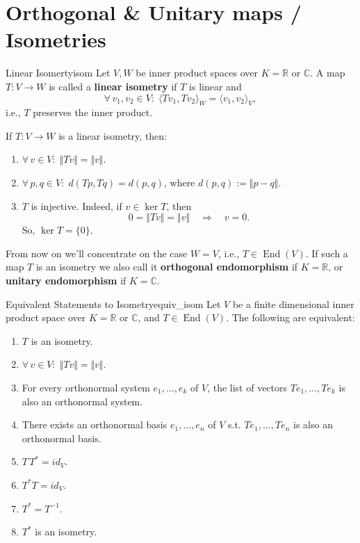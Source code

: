 % 
%
%
%

\section{Orthogonal \& Unitary maps / Isometries}
\begin{definition}{Linear Isomerty}{isom}
	Let $V, W$ be inner product spaces over $K = \mathbb{R}$ or $\mathbb{C}$. A map $T: V \to W$ is called a \textbf{linear isometry} if $T$ is linear and
	\[
		\forall \, v_1, v_2 \in V : \; \langle Tv_1, Tv_2 \rangle_W = \langle v_1, v_2 \rangle_V,
	\]
	i.e., $T$ preserves the inner product.
\end{definition}

\begin{remark}
	If $T:V \to W$ is a linear isometry, then:
	\begin{enumerate}
		\item $\forall \, v \in V : \; \Vert Tv \Vert = \Vert v \Vert$.
		\item $\forall\, p,q \in V : \; d(Tp, Tq) = d(p, q)$, where $d(p, q) := \Vert p - q \Vert$.
		\item $T$ is injective. Indeed, if $v \in \ker T$, then 
		\[
			0 = \Vert Tv \Vert = \Vert v \Vert \quad \Longrightarrow \quad v = 0.
		\]
		So, $\ker T = \{0\}$.
	\end{enumerate}
\end{remark}

From now on we'll concentrate on the case $W = V$, i.e., $T \in \operatorname{End}(V)$. If such a map $T$ is an isometry we also call it \textbf{orthogonal endomorphism} if $K = \mathbb{R}$, or \textbf{unitary endomorphism} if $K = \mathbb{C}$.

\begin{theorem}{Equivalent Statements to Isometry}{equiv_isom}
	Let $V$ be a finite dimensional inner product space over $K = \mathbb{R}$ or $\mathbb{C}$, and $T \in \operatorname{End}(V)$. The following are equivalent:
	\begin{enumerate}
		\item $T$ is an isometry.
		\item $\forall\, v \in V : \; \Vert Tv \Vert = \Vert v \Vert$.
		\item For every orthonormal system $e_1, \hdots , e_k$ of $V$, the list of vectors $Te_1, \hdots , Te_k$ is also an orthonormal system.
		\item There exists an orthonormal basis $e_1, \hdots , e_n$ of $V$ s.t. $Te_1, \hdots , Te_n$ is also an orthonormal basis.
		\item $T\,T^* = id_V$.
		\item $T^*T = id_V$.
		\item $T^* = T^{-1}$.
		\item $T^*$ is an isometry.
	\end{enumerate}
\end{theorem}

